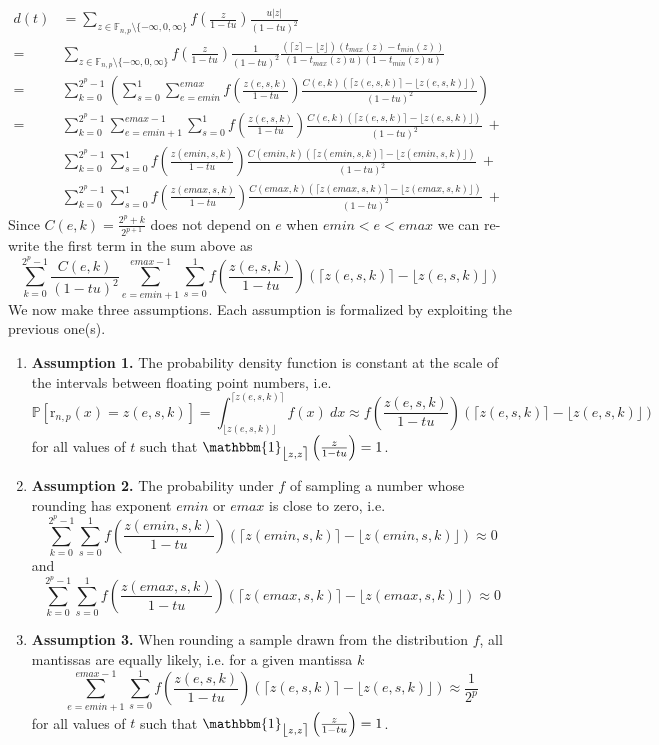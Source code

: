 \documentclass[10pt,a4paper]{article}
\theoremstyle{plain}
\theoremstyle{definition}
\newcommand{\F}[1][n,p]{\mathbb{F}_{#1}}
\newcommand{\Round}[1][n,p]{\mathrm{r}_{#1}}
\newcommand{\one}{\mathbbm{1}}
\newcommand{\ceil}[1]{\lceil #1 \rceil}
\newcommand{\floor}[1]{\lfloor #1 \rfloor}
\newcommand{\fintvl}[1][x]{\mathlarger{\lfloor}#1,#1\mathlarger{\rceil}}
\newcommand{\absv}[1]{\vert #1\vert}
\newcommand{\Pro}[1]{\mathbb{P}\left[ #1 \right]}
\begin{document}
\begin{align}
d(t)&=\sum_{z\in \F\setminus\{-\infty,0,\infty\}}f\left(\frac{z}{1-tu}\right) \frac{u\absv{z}}{(1-tu)^2}\nonumber
\\
=&\sum_{z\in \F\setminus\{-\infty,0,\infty\}}f\left(\frac{z}{1-tu}\right) \frac{1}{(1-tu)^2}\frac{(\ceil{z}-\floor{z})(t_{max}(z)-t_{min}(z))}{(1-t_{max}(z)u)(1-t_{min}(z)u)}&\nonumber
\\
=&\sum_{k=0}^{2^{p}-1}\left(\sum_{s=0}^1\sum_{e=emin}^{emax}f\left(\frac{z(e,s,k)}{1-tu}\right)\frac{C(e,k)(\ceil{z(e,s,k)}-\floor{z(e,s,k)})}{(1-tu)^2}\right)\nonumber 
\\
=&\sum_{k=0}^{2^p-1}\sum_{e=emin+1}^{emax-1}\sum_{s=0}^1 f\left(\frac{z(e,s,k)}{1-tu}\right)\frac{C(e,k)(\ceil{z(e,s,k)}-\floor{z(e,s,k)})}{(1-tu)^2}~+ \nonumber
\\
& \sum_{k=0}^{2^{p}-1}\sum_{s=0}^1 f\left(\frac{z(emin,s,k)}{1-tu}\right)\frac{C(emin,k)(\ceil{z(emin,s,k)}-\floor{z(emin,s,k)})}{(1-tu)^2}~+ \nonumber
\\
& \sum_{k=0}^{2^{p}-1}\sum_{s=0}^1 f\left(\frac{z(emax,s,k)}{1-tu}\right)\frac{C(emax,k)(\ceil{z(emax,s,k)}-\floor{z(emax,s,k)})}{(1-tu)^2}~+ \label{eq:pdf1/2}
\end{align}
Since $C(e,k)=\frac{2^p+k}{2^{p+1}}$ does not depend on $e$ when $emin<e<emax$ we can re-write the first term in the sum above as
\[
\sum_{k=0}^{2^p-1}\frac{C(e,k)}{(1-tu)^2}\sum_{e=emin+1}^{emax-1}\sum_{s=0}^1 f\left(\frac{z(e,s,k)}{1-tu}\right)(\ceil{z(e,s,k)}-\floor{z(e,s,k)})
\]
We now make three assumptions. Each assumption is formalized by exploiting the previous one(s).

\begin{enumerate}
\item \textbf{Assumption 1.} The probability density function is constant at the scale of the intervals between floating point numbers, i.e.
\[
\Pro{\Round(x)=z(e,s,k)}=\int_{\floor{z(e,s,k)}}^{\ceil{z(e,s,k)}} f(x)~dx \approx f\left(\frac{z(e,s,k)}{1-tu}\right)(\ceil{z(e,s,k)}-\floor{z(e,s,k)})
\]
for all values of $t$ such that $\one_{\fintvl[z]}\left(\frac{z}{1-tu}\right)=1$.
\item \textbf{Assumption 2.} The probability under $f$ of sampling a number whose rounding has exponent $emin$ or $emax$ is close to zero, i.e.
\[
 \sum_{k=0}^{2^{p}-1}\sum_{s=0}^1 f\left(\frac{z(emin,s,k)}{1-tu}\right)(\ceil{z(emin,s,k)}-\floor{z(emin,s,k)})\approx 0
\]
and
\[
 \sum_{k=0}^{2^{p}-1}\sum_{s=0}^1 f\left(\frac{z(emax,s,k)}{1-tu}\right)(\ceil{z(emax,s,k)}-\floor{z(emax,s,k)})\approx 0
\]
\item \textbf{Assumption 3.} When rounding a sample drawn from the distribution $f$, all mantissas are equally likely, i.e. for a given mantissa $k$
\[
\sum_{e=emin+1}^{emax-1}\sum_{s=0}^1 f\left(\frac{z(e,s,k)}{1-tu}\right)(\ceil{z(e,s,k)}-\floor{z(e,s,k)})\approx \frac{1}{2^p}
\]
for all values of $t$ such that $\one_{\fintvl[z]}\left(\frac{z}{1-tu}\right)=1$.
\end{enumerate}
\end{document}
